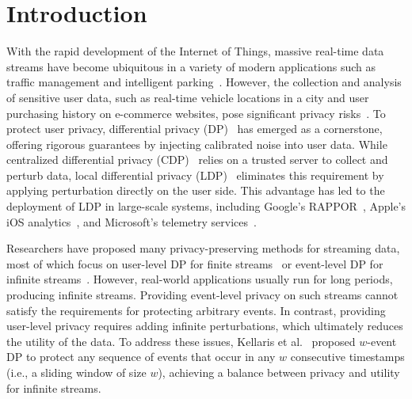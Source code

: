 \section{Introduction} \label{sec:introduction}

With the rapid development of the Internet of Things, massive real-time data
streams have become ubiquitous in a variety of modern applications such as
traffic management and intelligent parking~\cite{Babcock2002, Babu2001}.
However, the collection and analysis of sensitive user data, such as real-time
vehicle locations in a city and user purchasing history on e-commerce websites,
pose significant privacy risks~\cite{Al2022, Ray2020, Malhotra2021}.
To protect user privacy, differential privacy (DP)~\cite{Dwork2006} has emerged
as a cornerstone, offering rigorous guarantees by injecting calibrated noise into
user data.
While centralized differential privacy (CDP)~\cite{Bolot2013} relies on a
trusted server to collect and perturb data, local differential privacy
(LDP)~\cite{Wang2017l, Wang2018p, Ren2018, Zhang2018, Duchi2013, Cormode2018,
  Wang2019l, Murakami2019, Ye2019, Qin2016, Qin2017} eliminates this requirement
by applying perturbation directly on the user side.
This advantage has led to the deployment of LDP in large-scale systems,
including Google's RAPPOR~\cite{Erlingsson2014}, Apple’s iOS
analytics~\cite{Team2017}, and Microsoft’s telemetry services~\cite{Ding2017}.

Researchers have proposed many privacy-preserving methods for streaming data,
most of which focus on user-level DP for finite streams~\cite{Fan2013a,
  Fan2013, Fan2012} or event-level DP for infinite streams~\cite{Dwork2010,
  Bolot2013}.
However, real-world applications usually run for long periods, producing
infinite streams.
Providing event-level privacy on such streams cannot satisfy the requirements for
protecting arbitrary events.
In contrast, providing user-level privacy requires adding infinite
perturbations, which ultimately reduces the utility of the data.
To address these issues, Kellaris et al.~\cite{Kellaris2014} proposed $w$-event
DP to protect any sequence of events that occur in any $w$ consecutive
timestamps (i.e., a sliding window of size $w$), achieving a balance between
privacy and utility for infinite streams.

